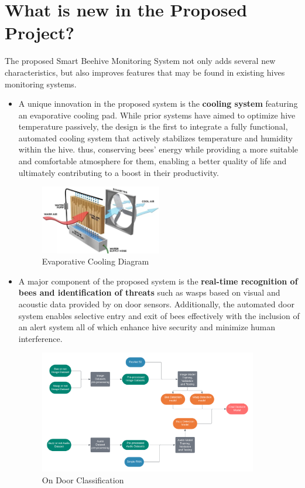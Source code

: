 \documentclass[12pt]{article}
\begin{document}
	\section{What is new in the Proposed Project?}
	The proposed Smart Beehive Monitoring System not only adds several new characteristics, but also improves features that may be found in existing hives monitoring systems. \\
	\begin{itemize}
		\item A unique innovation in the proposed system is the \textbf{cooling system} featuring an evaporative cooling pad. While prior systems have aimed to optimize hive temperature passively, the design is the first to integrate a fully functional, automated cooling system that actively stabilizes temperature and humidity within the hive. thus, conserving bees' energy while providing a more suitable and comfortable atmosphere  for them, enabling a better quality of life and ultimately contributing to a boost in their productivity. \\
		\begin{figure}[H]
			\centering
			\includegraphics[width=0.5\textwidth]{Images/swamp-cooler-diagram.jpg}
			\caption{Evaporative Cooling Diagram \cite{powerbreezer2021}}
			\label{fig:EVAPORATIVE_COOLER}
		\end{figure}
		
		\item A major component of the proposed system is the \textbf{real-time recognition of bees and identification of threats} such as wasps based on visual and acoustic data provided by on door sensors. Additionally, the automated door system enables selective entry and exit of bees effectively with the inclusion of an alert system all of which enhance hive security and minimize human interference.
		\begin{figure}[H]
			\centering
			\includegraphics[width=0.9\textwidth]{Images/Pipelines/On Door Classifier Pipeline Diagram.png}
			\caption{On Door Classification}
			\label{fig:DOOR_CLASSIFICATION}
		\end{figure}
	\end{itemize}
	\newpage
	
\end{document}

